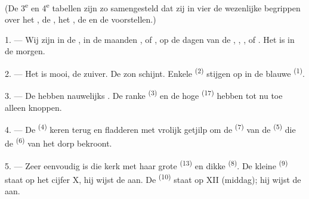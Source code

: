 
\VUsaut{3.0mm}
\VUsaut{1.6mm}
\VUsaut{3.4mm}

(De 3\textsuperscript{e} en 4\textsuperscript{e} tabellen zijn zo samengesteld dat zij in vier
 de wezenlijke begrippen over het
, de , het , de  en
de  voorstellen.)
\VUsaut{4.0mm}

\VUsaut{3.0mm}

\VUsaut{2.4mm}

\VUsaut{3.0mm}

1. --- Wij zijn in de , in de maanden ,
 of , op de dagen van de ,
, , of . Het is  in de morgen.

2. --- Het  is mooi, de  zuiver. De zon schijnt. Enkele
 \textsuperscript{(2)} stijgen op in de blauwe
 \textsuperscript{(1)}.

3. --- De  hebben nauwelijks . De ranke
 \textsuperscript{(3)} en de hoge 
\textsuperscript{(17)} hebben tot nu toe alleen knoppen.

4. --- De  \textsuperscript{(4)} keren terug en fladderen met vrolijk getjilp
om de  \textsuperscript{(7)} van de
 \textsuperscript{(5)} die de 
\textsuperscript{(6)} van het dorp bekroont.

\VUsaut{3.4mm}
\VUsaut{3.0mm}

5. --- Zeer eenvoudig is die kerk met haar grote  \textsuperscript{(13)} en
dikke  \textsuperscript{(8)}. De kleine
 \textsuperscript{(9)} staat op het cijfer X, hij wijst de
 aan. De  \textsuperscript{(10)} staat op XII
(middag); hij wijst de  aan.

